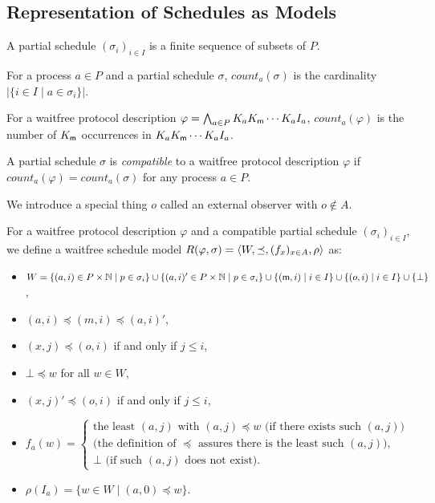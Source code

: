   \subsection{Representation of Schedules as Models}

  \begin{definition}
   A partial schedule $(\sigma_i)_{i\in I}$ is a finite sequence of
   subsets of $P$.
  \end{definition}

  \begin{definition}
   For a process $a\in P$ and a partial schedule $\sigma$, $count_a(\sigma)$ is the cardinality
   $\left|\{i\in I\mid a\in \sigma_i\}\right|$.

   For a waitfree protocol description $\varphi = \bigwedge_{a\in P}K_a K_{\sf m} \cdots K_a I_a$,
   $count_a(\varphi)$ is the number of $K_{\sf m}$ occurrences in $K_aK_{\sf m} \cdots
   K_a I_a$.

   A partial schedule $\sigma$ is \textit{compatible} to a waitfree
   protocol description $\varphi$ if
   $count_a(\varphi) = count_a(\sigma)$ for any process $a\in P$.
  \end{definition}

  We introduce a special thing $o$ called an external observer with $o \notin A$.
  \begin{definition}
   For a waitfree protocol description $\varphi$ and
   a compatible partial schedule $(\sigma_i)_{i\in I}$, we define
   a waitfree schedule model $R(\varphi, \sigma) = \langle{W, \preceq, (f_x)_{x\in A}, \rho}\rangle$ as:
   \begin{itemize}
    \item $
	  W = \{(a,i) \in P\times \mathbb N \mid p\in \sigma_i\} \cup
	  \{(a,i)' \in P\times \mathbb N \mid p\in \sigma_i\}
	  \cup \{({\sf m},i)\mid i\in I\} \cup \{(o,i) \mid i\in I\}\cup
	  \{\bot\}
	  $,
    \item $(a,i) \preceq (m, i)\preceq (a, i)'$,
    \item $(x,j)\preceq (o,i)$ if and only if $j\le i$,
    \item $\bot\preceq w$ for all $w \in W$,
    \item $(x,j)'\preceq (o,i)$ if and only if $j \le i$,
    \item
	 $
	 f_a(w) =
	 \left\{
	 \begin{array}{l}
	  \mbox{the least $(a,j)$ with $(a,j)\preceq w$ (if there exists such $(a,j)$)} \\
	  \mbox{(the definition of $\preceq$ assures there is the least such $(a,j)$)},\\
	  \mbox{$\bot$ (if such $(a,j)$ does not exist)}.
	 \end{array}
	 \right.
	 $
    \item $\rho(I_a) = \{w\in W\mid (a,0)\preceq w\}$.
   \end{itemize}
  \end{definition}

